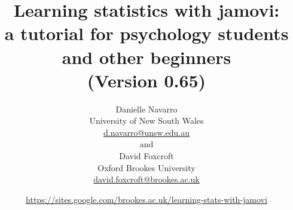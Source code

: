 


\date{\url{https://sites.google.com/brookes.ac.uk/learning-stats-with-jamovi} \hfill \\ }
\title{Learning statistics with jamovi:\\ a tutorial for psychology students and other beginners \vspace*{12pt}
\\ (Version 0.65) \\ \vspace*{24pt}}
\author{Danielle Navarro \\ University of New South Wales \\ \url{d.navarro@unsw.edu.au} \vspace*{12pt} \\
and \vspace*{12pt} \\
David Foxcroft \\ Oxford Brookes University \\ \url{david.foxcroft@brookes.ac.uk} \vspace*{36pt}}


 